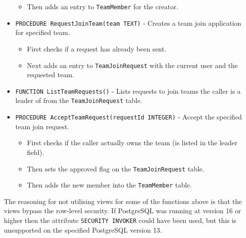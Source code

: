 \begin{itemize}
\begin{itemize}
            \item Then adds an entry to \verb|TeamMember| for the creator.
        \end{itemize}
    \item \verb|PROCEDURE RequestJoinTeam(team TEXT)| - Creates a team join application for specified team.
        \begin{itemize}
            \item First checks if a request has already been sent.
            \item Next adds an entry to \verb|TeamJoinRequest| with the current user and the requested team.
        \end{itemize}
    \item \verb|FUNCTION ListTeamRequests()| - Lists requests to join teams the caller is a leader of from the \verb|TeamJoinRequest| table.
    \item \verb|PROCEDURE AcceptTeamRequest(requestId INTEGER)| - Accept the specified team join request.
        \begin{itemize}
            \item First checks if the caller actually owns the team (is listed in the leader field).
            \item Then sets the approved flag on the \verb|TeamJoinRequest| table.
            \item Then adds the new member into the \verb|TeamMember| table.
        \end{itemize}
\end{itemize}

The reasoning for not utilising views for some of the functions above is that the views bypass the row-level security. If PostgreSQL was running at version 16 or higher then the attribute \verb|SECURITY INVOKER| could have been used, but this is unsupported on the specified PostgreSQL version 13.
